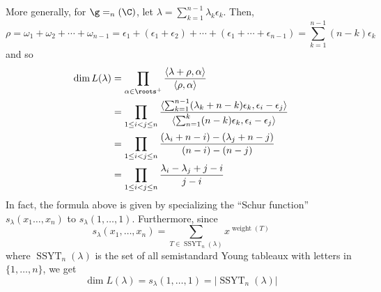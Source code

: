 \documentclass[11pt,leqno,oneside]{amsart}
\numberwithin{thm}{section}
\newcommand{\T}{T}
\newcommand{\halfsum}{\rho}
\DeclareMathOperator{\SSYT}{SSYT}
\DeclareMathOperator{\weight}{weight}
\begin{document}
\begin{example}
  More generally, for \(\g = \sl_n(\C)\), let \(\lambda =
  \sum_{k=1}^{n-1} \lambda_k \epsilon_k\). Then, \[
    \halfsum = \omega_1 + \omega_2 + \cdots + \omega_{n-1} = \epsilon_1 +
    (\epsilon_1+\epsilon_2) + \cdots + (\epsilon_1 + \cdots +
    \epsilon_{n-1}) = \sum_{k=1}^{n-1} (n-k) \epsilon_k
  \]
  and so
  \begin{align*}
    \dim L(\lambda)
    & = \prod_{\alpha \in \roots^+} \frac{\langle
      \lambda+\halfsum,\alpha \rangle}{\langle \halfsum,\alpha
      \rangle}\\
    & = \prod_{1 \leq i < j \leq n} \frac{\langle \sum_{k=1}^{n-1}
      (\lambda_k+n-k)\epsilon_k, \epsilon_i-\epsilon_j
      \rangle}{\langle \sum_{n=1}^k (n-k) \epsilon_k,
      \epsilon_i-\epsilon_j \rangle}\\
    & = \prod_{1 \leq i < j \leq n}
      \frac{(\lambda_i+n-i)-(\lambda_j+n-j)}{(n-i)-(n-j)} \\
    & = \prod_{1 \leq i < j \leq n}
      \frac{\lambda_i-\lambda_j+j-i}{j-i} 
  \end{align*}
  In fact, the formula above is given by specializing the ``Schur
  function'' \(s_\lambda(x_1 \ldots, x_n)\) to
  \(s_\lambda(1,\ldots,1)\). Furthermore, since \[
    s_\lambda(x_1, \ldots, x_{n}) = \sum_{\T \in \SSYT_{n}(\lambda)}
    x^{\weight(\T)} 
  \]
  where \(\SSYT_{n}(\lambda)\) is the set of all semistandard Young
  tableaux with letters in \(\{1,\ldots,n\}\), we get \[
    \dim L(\lambda) = s_{\lambda}(1,\ldots,1) = |\SSYT_{n}(\lambda)|
  \]
\end{example}
\end{document}
